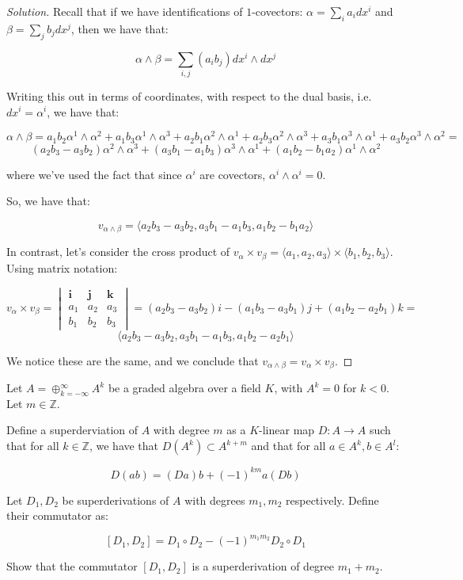 \documentclass[10pt]{article}
\newenvironment{problem}[2][]{\begin{trivlist}
\item[\hskip \labelsep {\bfseries #1}\hskip \labelsep {\bfseries #2.}]}{\end{trivlist}}
\begin{document}
\begin{proof}[Solution]

Recall that if we have identifications of $1$-covectors: $\alpha = \sum_i a_i dx^i$ and $\beta = \sum_j b_j dx^j$, then we have that:

$$ \alpha \wedge \beta = \sum_{i,j} (a_i b_j) dx^i \wedge dx^j$$

Writing this out in terms of coordinates, with respect to the dual basis, i.e. $dx^i = \alpha^i$, we have that:

$$\alpha \wedge \beta = a_1 b_2 \alpha^1 \wedge \alpha^2 + a_1 b_3 \alpha^1 \wedge \alpha^3 + a_2 b_1 \alpha^2\wedge \alpha^1 + a_2 b_3 \alpha^2 \wedge \alpha^3 + a_3 b_1 \alpha^3 \wedge \alpha^1 + a_3 b_2 \alpha^3 \wedge \alpha^2 =$$
$$ (a_2b_3 - a_3b_2) \alpha^2 \wedge \alpha^3 + (a_3b_1 - a_1b_3) \alpha^3 \wedge \alpha^1 + (a_1b_2  - b_1a_2) \alpha^1\wedge \alpha^2 $$

where we've used the fact that since $\alpha^i$ are covectors, $\alpha^i \wedge \alpha^i = 0$.

So, we have that:

$$ v_{\alpha\wedge\beta} = \langle a_2b_3 - a_3b_2, a_3b_1  - a_1b_3, a_1b_2 - b_1a_2 \rangle $$

In contrast, let's consider the cross product of $v_\alpha \times v_\beta = \langle a_1, a_2, a_3 \rangle \times \langle b_1, b_2, b_3 \rangle $. Using matrix notation:

$$v_\alpha \times v_\beta = \begin{vmatrix} \mathbf{i}& \mathbf{j}  & \mathbf{k} \\ a_1  &a_2 &a_3 \\ b_1 & b_2 & b_3 \end{vmatrix} =  (a_2b_3 - a_3b_2)i - (a_1 b_3 - a_3 b_1)j + (a_1b_2 - a_2b_1)k =$$
$$ \langle a_2b_3 - a_3b_2, a_3b_1 - a_1b_3, a_1b_2 - a_2b_1 \rangle $$

We notice these are the same, and we conclude that $ v_{\alpha \wedge \beta} = v_\alpha \times v_\beta $.


\end{proof}

\begin{problem}{Question 4}

Let $A = \oplus_{k=-\infty}^\infty A^k$ be a graded algebra over a field $K$, with $A^k = 0$ for $k  < 0$. Let $m \in \mathbb{Z}$.

Define a superderviation of $A$ with degree $m$ as a $K$-linear map $D: A \to A$ such that for all $k \in \mathbb{Z}$, we have that $D(A^k) \subset A^{k+m}$ and that for all $a \in A^k, b \in A^l$:

$$D(ab) = (Da) b + (-1)^{km} a (Db) $$

Let $D_1, D_2$ be superderivations of $A$ with degrees $m_1, m_2$ respectively. Define their commutator as:

$$ [D_1, D_2] = D_1 \circ D_2 - (-1)^{m_1m_2} D_2 \circ D_1 $$

Show that the commutator $[D_1, D_2]$ is a superderivation of degree $m_1 + m_2$.

\end{problem}
\end{document}
